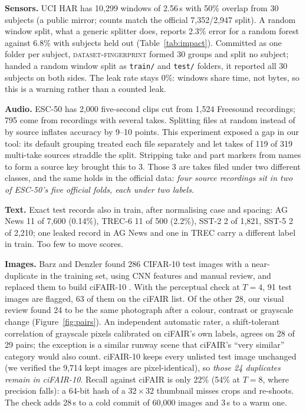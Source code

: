 \documentclass[sigconf,nonacm]{acmart}
\begin{document}
\textbf{Sensors.} UCI HAR \cite{anguita2013har} has 10,299 windows of 2.56\,s with 50\% overlap from 30 subjects (a public mirror;
counts match the official 7,352/2,947 split). A random window split, what a generic splitter does, reports
2.3\% error for a random forest against 6.8\% with subjects held out (Table~\ref{tab:impact}). Committed as
one folder per subject, \textsc{dataset-fingerprint} formed 30 groups and split no subject; handed a random
window split as \texttt{train/} and \texttt{test/} folders, it reported all 30 subjects on both sides. The
leak rate stays 0\%: windows share time, not bytes, so this is a warning rather than a counted leak.

\textbf{Audio.} ESC-50 \cite{piczak2015esc} has 2,000 five-second clips cut from 1,524 Freesound recordings; 795 come from
recordings with several takes. Splitting files at random instead of by source inflates accuracy by 9--10
points. This experiment exposed a gap in our tool: its default grouping treated each file separately and
let takes of 119 of 319 multi-take sources straddle the split. Stripping take and part markers from names
to form a source key brought this to 3. Those 3 are takes filed under two different classes, and the
same holds in the official data: \emph{four source recordings sit in two of ESC-50's five official folds,
each under two labels}.

\textbf{Text.} Exact test records also in train, after normalising case and spacing: AG News \cite{zhang2015charcnn} 11 of 7,600
(0.14\%), TREC-6 \cite{li2002trec} 11 of 500 (2.2\%), SST-2 \cite{socher2013sst} 2 of 1,821, SST-5 2 of 2,210; one leaked record in AG News and one
in TREC carry a different label in train. Too few to move scores.

\textbf{Images.} Barz and Denzler found 286 CIFAR-10 \cite{krizhevsky2009cifar} test images with a
near-duplicate in the training set, using CNN features and manual review, and replaced them to build
ciFAIR-10 \cite{barz2020cifair}. With the perceptual check at $T{=}4$, 91 test images are flagged, 63 of
them on the ciFAIR list. Of the other 28, our visual review found 24 to be the same photograph after a
colour, contrast or grayscale change (Figure~\ref{fig:pairs}). An independent automatic rater, a
shift-tolerant correlation of grayscale pixels calibrated on ciFAIR's own labels, agrees on 28 of 29
pairs; the exception is a similar runway scene that ciFAIR's ``very similar'' category would also count.
ciFAIR-10 keeps every unlisted test image unchanged (we verified the 9,714 kept images are
pixel-identical), so \emph{those 24 duplicates remain in ciFAIR-10}. Recall against ciFAIR is only 22\%
(54\% at $T{=}8$, where precision falls): a 64-bit hash of a $32{\times}32$ thumbnail misses crops and
re-shoots. The check adds 28\,s to a cold commit of 60,000 images and 3\,s to a warm one.
\end{document}
